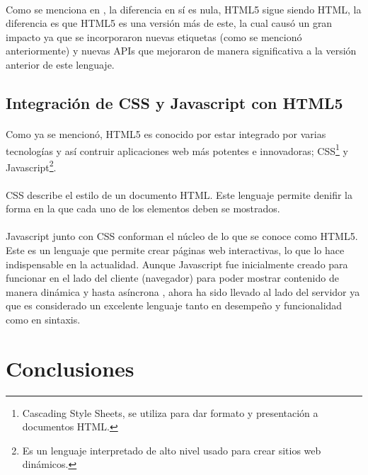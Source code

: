 \documentclass{article}
\begin{document}
\paragraph{}
Como se menciona en \cite{diff_1}, la diferencia en sí es nula, HTML5 sigue
siendo HTML, la diferencia es que HTML5 es una versión más de este, la cual
causó un gran impacto ya que se incorporaron nuevas etiquetas (como se mencionó
anteriormente) y nuevas APIs que mejoraron de manera significativa a la versión
anterior de este lenguaje.

\subsection{Integración de CSS y Javascript con HTML5}

\paragraph{}
Como ya se mencionó, HTML5 es conocido por estar integrado por varias
tecnologías y así contruir aplicaciones web más potentes e innovadoras;
CSS\footnote{Cascading Style Sheets, se utiliza para dar formato y presentación
a documentos HTML.} y
Javascript\footnote{Es un lenguaje interpretado de alto nivel usado para crear
sitios web dinámicos.}.

\paragraph{}
CSS describe el estilo de un documento HTML. Este lenguaje permite denifir la
forma en la que cada uno de los elementos deben se mostrados\cite{css}.

\paragraph{}
Javascript junto con CSS conforman el núcleo de lo que se conoce como HTML5.
Este es un lenguaje que permite crear páginas web interactivas, lo que lo hace
indispensable en la actualidad\cite{javascript}.
Aunque Javascript fue inicialmente creado para funcionar en el lado del cliente
(navegador) para poder mostrar contenido de manera dinámica y hasta asíncrona
, ahora ha sido llevado al lado del servidor ya que es considerado
un excelente lenguaje tanto en desempeño y funcionalidad como en sintaxis.

\section{Conclusiones}
\end{document}
